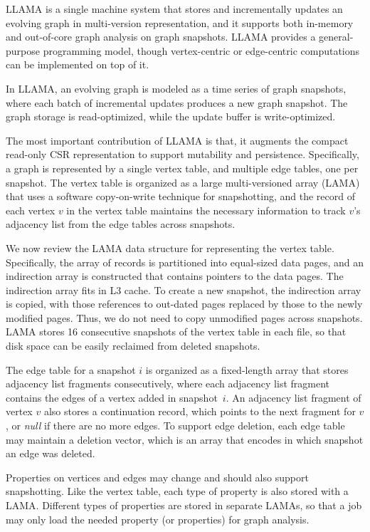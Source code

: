 \documentclass{svjour3}
\begin{document}
LLAMA is a single machine system that stores and incrementally updates an evolving graph in multi-version representation, and it supports both in-memory and out-of-core graph analysis on graph snapshots. LLAMA provides a general-purpose programming model, though vertex-centric or edge-centric computations can be implemented on top of it.

In LLAMA, an evolving graph is modeled as a time series of graph snapshots, where each batch of incremental updates produces a new graph snapshot. The graph storage is read-optimized, while the update buffer is write-optimized.

The most important contribution of LLAMA is that, it augments the compact read-only CSR representation to support mutability and persistence. Specifically, a graph is represented by a single vertex table, and multiple edge tables, one per snapshot. The vertex table is organized as a large multi-versioned array (LAMA) that uses a software copy-on-write technique for snapshotting, and the record of each vertex $v$ in the vertex table maintains the necessary information to track $v$'s adjacency list from the edge tables across snapshots.

We now review the LAMA data structure for representing the vertex table. Specifically, the array of records is partitioned into equal-sized data pages, and an indirection array is constructed that contains pointers to the data pages. The indirection array fits in L3 cache. To create a new snapshot, the indirection array is copied, with those references to out-dated pages replaced by those to the newly modified pages. Thus, we do not need to copy unmodified pages across snapshots. LAMA stores 16 consecutive snapshots of the vertex table in each file, so that disk space can be easily reclaimed from deleted snapshots.

The edge table for a snapshot $i$ is organized as a fixed-length array that stores adjacency list fragments consecutively, where each adjacency list fragment contains the edges of a vertex added in snapshot~$i$. An adjacency list fragment of vertex $v$ also stores a continuation record, which points to the next fragment for $v$, or {\em null} if there are no more edges. To support edge deletion, each edge table may maintain a deletion vector, which is an array that encodes in which snapshot an edge was deleted.

Properties on vertices and edges may change and should also support snapshotting. Like the vertex table, each type of property is also stored with a LAMA. Different types of properties are stored in separate LAMAs, so that a job may only load the needed property (or properties) for graph analysis.
\end{document}
